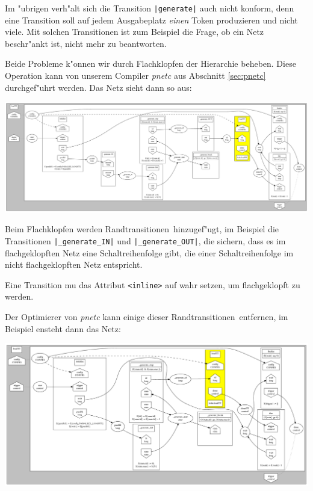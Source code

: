 \documentclass[a4paper,12pt]{article}
\newlength{\st}\setlength{\st}{0pt}
\newcommand{\program}[1]{\textit{#1}}
\newcommand{\transition}[1]{\texttt{|#1|}}
\newcommand{\attribute}[1]{\texttt{<#1>}}
\begin{document}
Im "ubrigen verh"alt sich die Transition \transition{generate} auch nicht
konform, denn eine Transition soll auf jedem Ausgabeplatz \emph{einen}
Token produzieren und nicht viele. Mit solchen Transitionen ist zum
Beispiel die Frage, ob ein Netz beschr"ankt ist, nicht mehr zu
beantworten.

Beide Probleme k"onnen wir durch Flachklopfen der Hierarchie
beheben. Diese Operation kann von unserem Compiler \program{pnetc} aus
Abschnitt \ref{sec:pnetc} durchgef"uhrt werden. Das Netz sieht dann so
aus:

\begin{center}
\includegraphics[width=\textwidth]{loadTT_flat.pdf}
\end{center}

Beim Flachklopfen werden \glqq Randtransitionen\grqq\ hinzugef"ugt, im
Beispiel die Transitionen \transition{\_generate\_IN} und
\transition{\_generate\_OUT}, die sichern, dass es im flachgeklopften Netz
eine Schaltreihenfolge gibt, die einer Schaltreihenfolge im nicht
flachgeklopften Netz entspricht.

Eine Transition mu\3 das Attribut \attribute{inline} auf wahr setzen,
um flachgeklopft zu werden.

Der Optimierer von \program{pnetc} kann einige dieser \glqq
Randtransitionen\grqq\ entfernen, im Beispiel ensteht dann das Netz:

\begin{center}
\includegraphics[width=\textwidth]{loadTT_flat_O.pdf}
\end{center}
\end{document}

